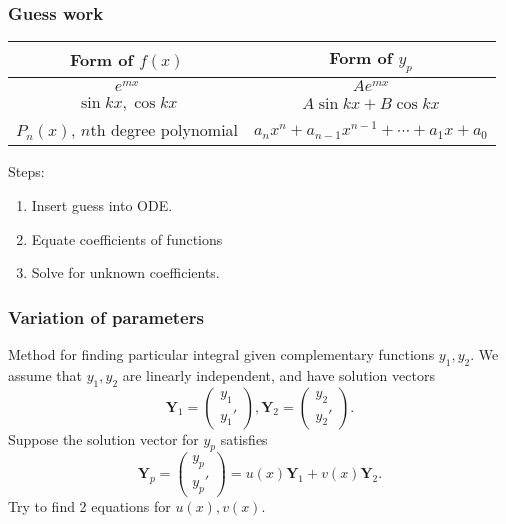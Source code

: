 \documentclass[a4paper]{article}
\begin{document}
    \subsubsection{Guess work}
    \begin{center}
        \begin{tabular}{cc}
        \toprule
        Form of $f(x)$ & Form of $y_p$ \\ \midrule
        $ e^{mx} $ & $ Ae^{mx} $ \\
        $ \sin kx, \cos kx $ & $ A \sin kx + B \cos kx $ \\
        $ P_n(x) $, $n$th degree polynomial & $ a_nx^n+a_{n-1}x^{n-1}+\cdots+a_1x+a_0 $ \\ \bottomrule
        \end{tabular}
        \end{center}
        Steps:
        \begin{enumerate}
            \item Insert guess into ODE.
            \item Equate coefficients of functions
            \item Solve for unknown coefficients.
        \end{enumerate}
    \subsubsection{Variation of parameters}
    Method for finding particular integral given complementary functions $ y_1,y_2 $. We assume that $ y_1,y_2 $ are linearly independent, and have solution vectors 
    \[
        \mathbf{Y}_1=\begin{pmatrix}
            y_1\\y_1'
        \end{pmatrix},
        \mathbf{Y}_2=\begin{pmatrix}
            y_2\\y_2'
        \end{pmatrix}
    .\]
    Suppose the solution vector for $ y_p $ satisfies
    \begin{equation}\label{eq:14.1}
        \mathbf{Y}_p=\begin{pmatrix}
            y_p\\y_p'
        \end{pmatrix}
        =u(x)\mathbf{Y}_1+v(x)\mathbf{Y}_2.
    \end{equation}
    Try to find 2 equations for $u(x),v(x)$.
\end{document}
